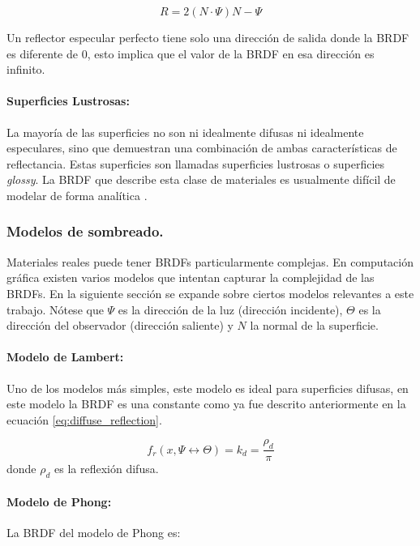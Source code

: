 \begin{equation}
    R = 2(N\cdot\Psi)N - \Psi
    \label{eq:reflectance_direction}
\end{equation}

Un reflector especular perfecto tiene solo una dirección de salida donde la \ac{BRDF} es diferente de $0$, esto implica que el valor de la \ac{BRDF} en esa dirección es infinito.

\paragraph{Superficies Lustrosas:}
La mayoría de las superficies no son ni idealmente difusas ni idealmente especulares, sino que demuestran una combinación de ambas características de reflectancia. Estas superficies son llamadas superficies lustrosas o superficies \emph{glossy}. La \ac{BRDF} que describe esta clase de materiales es usualmente difícil de modelar de forma analítica \cite{advanced_gi2006}.

\subsubsection{Modelos de sombreado.}
Materiales reales puede tener \ac{BRDF}s particularmente complejas. En computación gráfica existen varios modelos que intentan capturar la complejidad de las \ac{BRDF}s. En la siguiente sección se expande sobre ciertos modelos relevantes a este trabajo. Nótese que $\Psi$ es la dirección de la luz (dirección incidente), $\Theta$ es la dirección del observador (dirección saliente) y $N$ la normal de la superficie.

\paragraph{Modelo de Lambert:}
Uno de los modelos más simples, este modelo es ideal para superficies difusas, en este modelo la \ac{BRDF} es una constante como ya fue descrito anteriormente en la ecuación \ref{eq:diffuse_reflection}.

\begin{equation}
    f_{r}(x, \Psi\leftrightarrow\Theta) = k_{d} = \frac{\rho_{d}}{\pi}
    \label{eq:lambert}
\end{equation} donde $\rho_{d}$ es la reflexión difusa.

\paragraph{Modelo de Phong:}
La \ac{BRDF} del modelo de Phong es:

